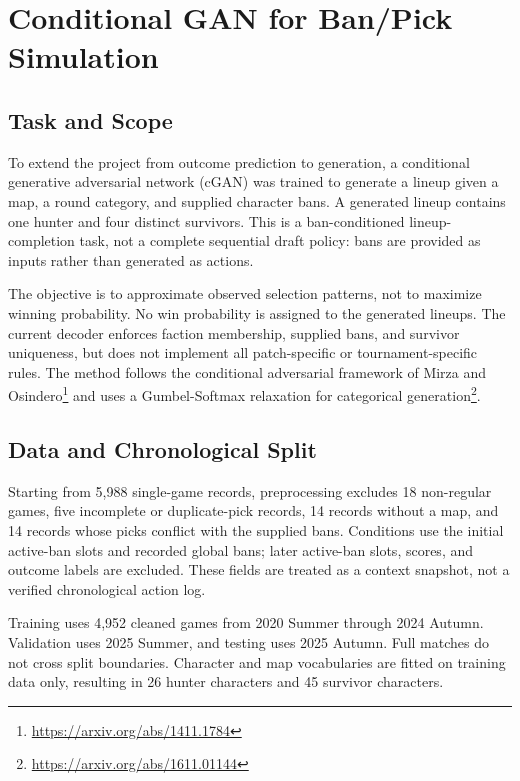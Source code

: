 \section{Conditional GAN for Ban/Pick Simulation}
\label{sec:bpgan}

\subsection{Task and Scope}
To extend the project from outcome prediction to generation, a conditional
generative adversarial network (cGAN) was trained to generate a lineup given
a map, a round category, and supplied character bans. A generated lineup
contains one hunter and four distinct survivors. This is a ban-conditioned
lineup-completion task, not a complete sequential draft policy: bans are
provided as inputs rather than generated as actions.

The objective is to approximate observed selection patterns, not to maximize
winning probability. No win probability is assigned to the generated lineups.
The current decoder enforces faction membership, supplied bans, and survivor
uniqueness, but does not implement all patch-specific or tournament-specific
rules. The method follows the conditional adversarial framework of Mirza and
Osindero\footnote{\url{https://arxiv.org/abs/1411.1784}} and uses a
Gumbel-Softmax relaxation for categorical
generation\footnote{\url{https://arxiv.org/abs/1611.01144}}.

\subsection{Data and Chronological Split}
Starting from 5,988 single-game records, preprocessing excludes 18 non-regular
games, five incomplete or duplicate-pick records, 14 records without a map,
and 14 records whose picks conflict with the supplied bans. Conditions use
the initial active-ban slots and recorded global bans; later active-ban slots,
scores, and outcome labels are excluded. These fields are treated as a
context snapshot, not a verified chronological action log.

Training uses 4,952 cleaned games from 2020 Summer through 2024 Autumn.
Validation uses 2025 Summer, and testing uses 2025 Autumn. Full matches do not
cross split boundaries. Character and map vocabularies are fitted on training
data only, resulting in 26 hunter characters and 45 survivor characters.

